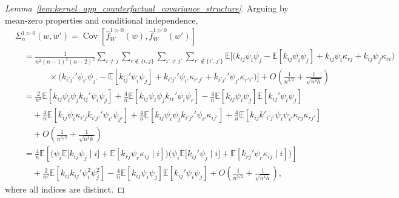 \documentclass[11pt,lof]{puthesis}
\newcommand{\E}{\ensuremath{\mathbb{E}}}
\DeclareMathOperator{\Cov}{Cov}
\theoremstyle{break}
\theoremstyle{proof}
\newtheorem{proof}{Proof}
\begin{document}
\begin{proof}[Lemma~\ref{lem:kernel_app_counterfactual_covariance_structure}]

  Arguing by mean-zero properties and conditional independence,
  \begin{align*}
    &\Sigma_n^{1 \triangleright 0}(w,w')
    = \Cov\left[
      \hat f_W^{1 \triangleright 0}(w),
      \hat f_W^{1 \triangleright 0}(w')
    \right] \\
    &\quad=
    \frac{1}{n^2(n-1)^2(n-2)^2}
    \sum_{i \neq j}
    \sum_{r \notin \{i,j\}}
    \sum_{i' \neq j'}
    \sum_{r' \notin \{i',j'\}}
    \!\!\!\!\E\Big[
      \!\Big(
        k_{i j} \psi_i \psi_j
        - \E[k_{i j} \psi_i \psi_j]
        + k_{i j}\psi_i \kappa_{r j}
        + k_{i j}\psi_j \kappa_{r i}
      \Big) \\
      &\qquad\qquad\times
      \Big(
        k_{i' j'}' \psi_{i'} \psi_{j'}
        - \E[k_{i j}' \psi_i \psi_j]
        + k_{i' j'}'\psi_{i'} \kappa_{r' j'}
        + k_{i' j'}'\psi_{j'} \kappa_{r' i'}
      \Big)
    \Big]
    + O\left( \frac{1}{n^{3/2}} + \frac{1}{\sqrt{n^4h}} \right) \\
    &\quad=
    \frac{2}{n^2}
    \E\left[
      k_{i j} \psi_i \psi_j
      k_{i j}' \psi_i \psi_j
    \right]
    + \frac{4}{n}
    \E\left[
      k_{i j} \psi_i \psi_j
      k_{i r}' \psi_i \psi_r
    \right]
    - \frac{4}{n}
    \E\left[
      k_{i j} \psi_i \psi_j
    \right]
    \E\left[
      k_{i j}' \psi_i \psi_j
    \right] \\
    &\qquad+
    \frac{4}{n}
    \E\left[
      k_{i j}\psi_i \kappa_{i' j}
      k_{i' j'}' \psi_{i'} \psi_{j'}
    \right]
    + \frac{4}{n}
    \E\left[
      k_{i j} \psi_{i} \psi_{j}
      k_{i' j'}'\psi_{i'} \kappa_{i j'}
    \right]
    + \frac{4}{n}
    \E\left[
      k_{i j} k'_{i' j'}
      \psi_i \psi_{i'}
      \kappa_{r j} \kappa_{r j'}
    \right] \\
    &\qquad+
    O\left( \frac{1}{n^{3/2}} + \frac{1}{\sqrt{n^4h}} \right) \\
    &\quad=
    \frac{4}{n}
    \E\left[
      \Big(
        \psi_i
        \E\big[
          k_{i j} \psi_j
          \mid i
        \big]
        + \E\left[
          k_{r j} \psi_r \kappa_{i j}
          \mid i
        \right]
      \Big)
      \Big(
        \psi_i
        \E\big[
          k_{i j}' \psi_j
          \mid i
        \big]
        + \E\left[
          k_{r j}' \psi_r \kappa_{i j}
          \mid i
        \right]
      \Big)
    \right] \\
    &\qquad+
    \frac{2}{n^2}
    \E\left[
      k_{i j} k_{i j}'
      \psi_i^2 \psi_j^2
    \right]
    - \frac{4}{n}
    \E\left[
      k_{i j} \psi_i \psi_j
    \right]
    \E\left[
      k_{i j}' \psi_i \psi_j
    \right]
    + O\left( \frac{1}{n^{3/2}} + \frac{1}{\sqrt{n^4h}} \right),
  \end{align*}
  where all indices are distinct.
\end{proof}
\end{document}

